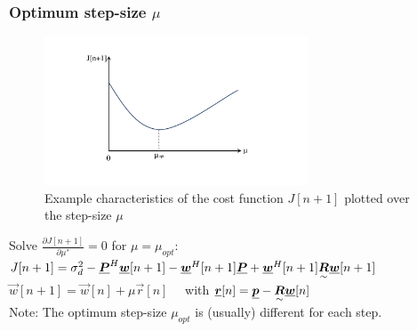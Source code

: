 \subsubsection{Optimum step-size \texorpdfstring{$\mu$}{}}
\begin{figure}[H]
	\centering
		\includegraphics[trim =1cm 3cm 5cm 2cm, clip, width=0.70\textwidth]{graphics/Optimum_step_size_examplepdf.pdf}
	\caption{Example characteristics of the cost function $J[n+1]$ plotted over the step-size $\mu$}
	\label{fig:Optimum_step_size_examplepdf}
\end{figure}
\begin{doublespace}
Solve $\frac{\partial J[n+1]}{\partial \mu^*}=0$ for $\mu=\mu_{opt}$:\\
$J[n+1]=\sigma_d^2-\underline{\boldsymbol {P}}^H\underline{\boldsymbol {w}}[n+1]-\underline{\boldsymbol {w}}^H[n+1]\underline{\boldsymbol {P}}+\underline{\boldsymbol {w}}^H[n+1]\underset{\sim}{\boldsymbol {R}}\underline{\boldsymbol {w}}[n+1]$\\
$\vec{w}[n+1]=\vec{w}[n]+\mu\vec{r}[n]\quad$ with $\underline{\boldsymbol {r}}[n]=\underline{\boldsymbol {p}}-\underset{\sim}{\boldsymbol {R}}\underline{\boldsymbol {w}}[n]$\\
Note: The optimum step-size $\mu_{opt}$ is (usually) different for each step.
\end{doublespace}

